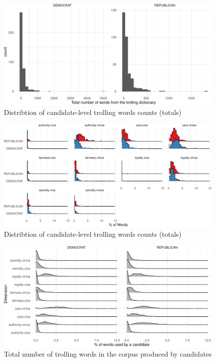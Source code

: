 \documentclass[
  12pt,
]{article}
\begin{document}
\begin{figure}
\centering
\includegraphics{figsFB/unnamed-chunk-20-1.pdf}
\caption{\label{fig:unnamed-chunk-20}Distribtion of candidate-level trolling words counts (totals)}
\end{figure}

\begin{figure}
\centering
\includegraphics{figsFB/unnamed-chunk-21-1.pdf}
\caption{\label{fig:unnamed-chunk-21}Distribtion of candidate-level trolling words counts (totals)}
\end{figure}

\begin{figure}
\centering
\includegraphics{figsFB/unnamed-chunk-22-1.pdf}
\caption{\label{fig:unnamed-chunk-22}Total number of trolling words in the corpus produced by candidates}
\end{figure}
\end{document}
